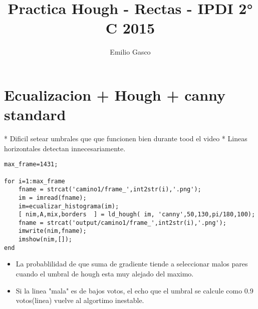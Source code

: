 \documentclass[a4paper,spanish]{article}
\title{Practica Hough - Rectas - IPDI 2° C 2015}
\author{Emilio Gasco}
\begin{document}
\maketitle

\renewcommand{\thesection}{Ejercicio \arabic{section}}
\renewcommand{\thesubsection}{\alph{subsection}}
\renewcommand{\thesubsubsection}{\roman{subsubsection}}
\newcommand{\myss}[3]{
    \begin{subfigure}[b]{#1\textwidth}
        \texttt{[image: img/\#2]}
        \caption{#3}
        \label{fig:#2}
    \end{subfigure}
}

\section{Ecualizacion + Hough + canny standard}

* Dificil setear umbrales que que funcionen bien durante tood el video
*  Lineas horizontales detectan innecesariamente.
\begin{verbatim}
max_frame=1431;

for i=1:max_frame
    fname = strcat('camino1/frame_',int2str(i),'.png');
    im = imread(fname);
    im=ecualizar_histograma(im);
    [ nim,A,mix,borders  ] = ld_hough( im, 'canny',50,130,pi/180,100);
    fname = strcat('output/camino1/frame_',int2str(i),'.png');
    imwrite(nim,fname);
    imshow(nim,[]);
end
\end{verbatim}



\begin{itemize}
\item La probablilidad de que suma de gradiente tiende a seleccionar malos pares cuando el umbral de hough esta muy alejado del maximo. 
\item Si la linea "mala" es de bajos votos, el echo que el umbral se calcule como 0.9 votos(linea) vuelve al algortimo inestable. 
\end{itemize}
\end{document}
